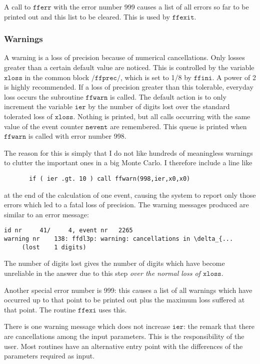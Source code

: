 \documentclass[twoside,12pt]{report}
\def\Code#1{\ensuremath{\texttt{#1}}}
\begin{document}
\begin{appendix}
A call to \Code{fferr} with the error number 999 causes a list of all 
errors so far to be printed out and this list to be cleared.  This is 
used by \Code{ffexit}.


\subsubsection{Warnings}

A warning is a loss of precision because of numerical cancellations.  
Only losses greater than a certain default value are noticed.  This is 
controlled by the variable \Code{xloss} in the common block 
\Code{/ffprec/}, which is set to 1/8 by \Code{ffini}.  A power of 2 is 
highly recommended.  If a loss of precision greater than this tolerable, 
everyday loss occurs the subroutine \Code{ffwarn} is called.  The 
default action is to only increment the variable \Code{ier} by the 
number of digits lost over the standard tolerated loss of \Code{xloss}.  
Nothing is printed, but all calls occurring with the same value of the 
event counter \Code{nevent} are remembered.  This queue is printed when 
\Code{ffwarn} is called with error number 998.

The reason for this is simply that I do not like hundreds of meaningless 
warnings to clutter the important ones in a big Monte Carlo.  I 
therefore include a line like
\begin{verbatim}
       if ( ier .gt. 10 ) call ffwarn(998,ier,x0,x0)
\end{verbatim}
at the end of the calculation of one event, causing the system to report only 
those errors which led to a fatal loss of precision.  The warning messages 
produced are similar to an error message:
\begin{verbatim}
id nr     41/     4, event nr   2265
warning nr    138: ffdl3p: warning: cancellations in \delta_{...
     (lost    1 digits)
\end{verbatim}
The number of digits lost gives the number of digits which have become 
unreliable in the answer due to this step {\em over the normal loss of 
\Code{xloss}}.

Another special error number is 999: this causes a list of all warnings 
which have occurred up to that point to be printed out plus the maximum 
loss suffered at that point.  The routine \Code{ffexi} uses this.

There is one warning message which does not increase \Code{ier}: the 
remark that there are cancellations among the input parameters.  This is 
the responsibility of the user.  Most routines have an alternative entry 
point with the differences of the parameters required as input.


\end{appendix}
\end{document}
